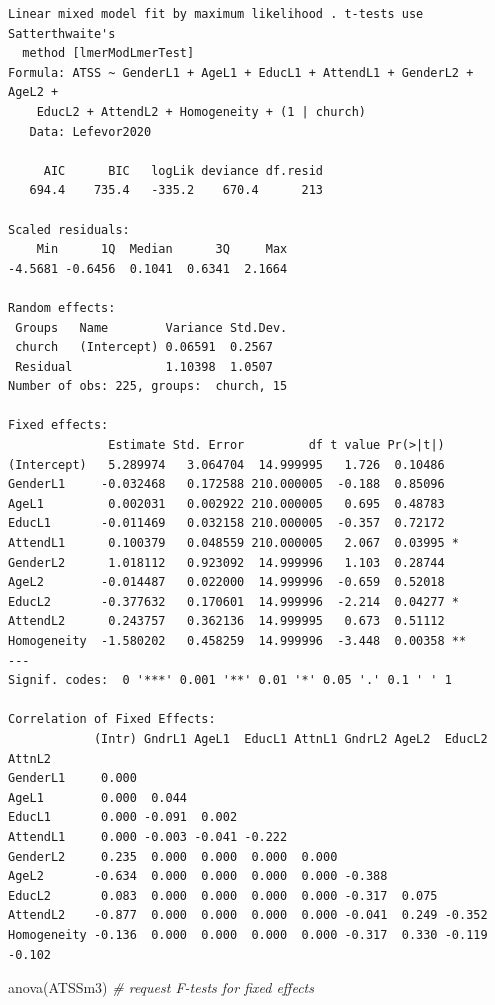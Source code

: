 \documentclass[
  english,
]{book}
\newenvironment{Shaded}{\begin{snugshade}}{\end{snugshade}}
\newcommand{\CommentTok}[1]{\textcolor[rgb]{0.56,0.35,0.01}{\textit{#1}}}
\newcommand{\FunctionTok}[1]{\textcolor[rgb]{0.00,0.00,0.00}{#1}}
\newcommand{\NormalTok}[1]{#1}
\begin{document}
\begin{verbatim}
Linear mixed model fit by maximum likelihood . t-tests use Satterthwaite's
  method [lmerModLmerTest]
Formula: ATSS ~ GenderL1 + AgeL1 + EducL1 + AttendL1 + GenderL2 + AgeL2 +  
    EducL2 + AttendL2 + Homogeneity + (1 | church)
   Data: Lefevor2020

     AIC      BIC   logLik deviance df.resid 
   694.4    735.4   -335.2    670.4      213 

Scaled residuals: 
    Min      1Q  Median      3Q     Max 
-4.5681 -0.6456  0.1041  0.6341  2.1664 

Random effects:
 Groups   Name        Variance Std.Dev.
 church   (Intercept) 0.06591  0.2567  
 Residual             1.10398  1.0507  
Number of obs: 225, groups:  church, 15

Fixed effects:
              Estimate Std. Error         df t value Pr(>|t|)   
(Intercept)   5.289974   3.064704  14.999995   1.726  0.10486   
GenderL1     -0.032468   0.172588 210.000005  -0.188  0.85096   
AgeL1         0.002031   0.002922 210.000005   0.695  0.48783   
EducL1       -0.011469   0.032158 210.000005  -0.357  0.72172   
AttendL1      0.100379   0.048559 210.000005   2.067  0.03995 * 
GenderL2      1.018112   0.923092  14.999996   1.103  0.28744   
AgeL2        -0.014487   0.022000  14.999996  -0.659  0.52018   
EducL2       -0.377632   0.170601  14.999996  -2.214  0.04277 * 
AttendL2      0.243757   0.362136  14.999995   0.673  0.51112   
Homogeneity  -1.580202   0.458259  14.999996  -3.448  0.00358 **
---
Signif. codes:  0 '***' 0.001 '**' 0.01 '*' 0.05 '.' 0.1 ' ' 1

Correlation of Fixed Effects:
            (Intr) GndrL1 AgeL1  EducL1 AttnL1 GndrL2 AgeL2  EducL2 AttnL2
GenderL1     0.000                                                        
AgeL1        0.000  0.044                                                 
EducL1       0.000 -0.091  0.002                                          
AttendL1     0.000 -0.003 -0.041 -0.222                                   
GenderL2     0.235  0.000  0.000  0.000  0.000                            
AgeL2       -0.634  0.000  0.000  0.000  0.000 -0.388                     
EducL2       0.083  0.000  0.000  0.000  0.000 -0.317  0.075              
AttendL2    -0.877  0.000  0.000  0.000  0.000 -0.041  0.249 -0.352       
Homogeneity -0.136  0.000  0.000  0.000  0.000 -0.317  0.330 -0.119 -0.102
\end{verbatim}

\begin{Shaded}
\begin{Highlighting}[]
\FunctionTok{anova}\NormalTok{(ATSSm3) }\CommentTok{\# request F{-}tests for fixed effects}
\end{Highlighting}
\end{Shaded}
\end{document}
